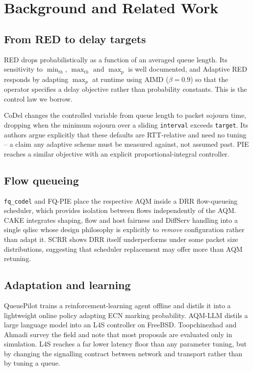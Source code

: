 \documentclass[conference]{IEEEtran}
\begin{document}
\section{Background and Related Work}
\label{sec:related}

\subsection{From RED to delay targets}

RED \cite{red1993} drops probabilistically as a function of an averaged queue
length. Its sensitivity to $\min_{th}$, $\max_{th}$ and $\max_p$ is well
documented, and Adaptive RED \cite{ared2001} responds by adapting $\max_p$ at
runtime using AIMD ($\beta = 0.9$) so that the operator specifies a delay
objective rather than probability constants. This is the control law we borrow.

CoDel \cite{nichols2012,rfc8289} changes the controlled variable from queue
length to packet sojourn time, dropping when the minimum sojourn over a sliding
\texttt{interval} exceeds \texttt{target}. Its authors argue explicitly that
these defaults are RTT-relative and need no tuning -- a claim any adaptive
scheme must be measured against, not assumed past. PIE \cite{rfc8033} reaches a
similar objective with an explicit proportional-integral controller.

\subsection{Flow queueing}

\texttt{fq\_codel} \cite{rfc8290} and FQ-PIE \cite{fqpie2019} place the
respective AQM inside a DRR flow-queueing scheduler, which provides isolation
between flows independently of the AQM. CAKE \cite{cake2018} integrates
shaping, flow and host fairness and DiffServ handling into a single qdisc whose
design philosophy is explicitly to \emph{remove} configuration rather than
adapt it. SCRR \cite{scrr2025} shows DRR itself underperforms under some packet
size distributions, suggesting that scheduler replacement may offer more than
AQM retuning.

\subsection{Adaptation and learning}

QueuePilot \cite{queuepilot2023} trains a reinforcement-learning agent offline
and distils it into a lightweight online policy adapting ECN marking
probability. AQM-LLM \cite{aqmllm2025} distils a large language model into an
L4S controller on FreeBSD. Toopchinezhad and Ahmadi \cite{mlaqm2025} survey the
field and note that most proposals are evaluated only in simulation. L4S
\cite{rfc9330,rfc9332} reaches a far lower latency floor than any parameter
tuning, but by changing the signalling contract between network and transport
rather than by tuning a queue.
\end{document}

